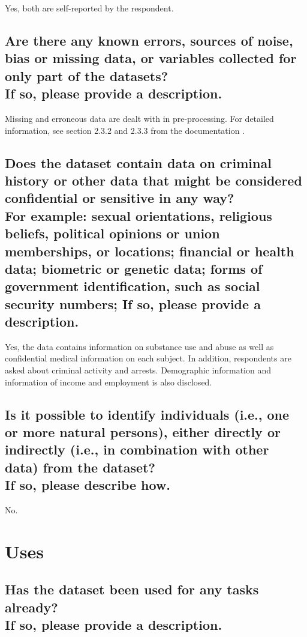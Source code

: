 \documentclass[letterpaper, 10 pt, conference]{ieeeconf}  %
\newcommand{\subtitle}[1]{{\\ \small \normalfont \color{purple} #1}}
\begin{document}
Yes, both are self-reported by the respondent. 

\subsection{Are there any known errors, sources of noise, bias or missing data, or variables collected for only part of the datasets? \subtitle{If so, please provide a description.}}

Missing and erroneous data are dealt with in pre-processing. For detailed information, see section 2.3.2 and 2.3.3 from the documentation \cite{nsduh_method}.

\subsection{Does the dataset contain data on criminal history or other data that might be considered confidential or sensitive in any way? \subtitle{For example: sexual orientations, religious beliefs, political opinions or union memberships, or locations; financial or health data; biometric or genetic data; forms of government identification, such as social security numbers; If so, please provide a description.}}

Yes, the data contains information on substance use and abuse as well as confidential medical information on each subject. In addition, respondents are asked about criminal activity and arrests. Demographic information and information of income and employment is also disclosed.   

\subsection{Is it possible to identify individuals (i.e., one or more natural persons), either directly or indirectly (i.e., in combination with other data) from the dataset? \subtitle{If so, please describe how.}}

No.


\section{Uses}

\subsection{Has the dataset been used for any tasks already? \subtitle{If so, please provide a description.}}
\end{document}
